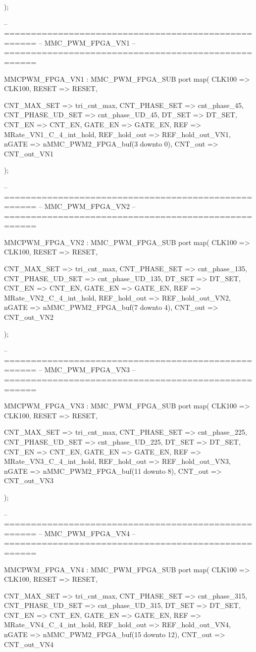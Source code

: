 \begin{mylisting}[language=VHDL,caption=ゲート信号出力モジュール,label=MMC_PWM_GEN_module_VHDL]
			);

-- ====================================================
-- MMC_PWM_FPGA_VN1
-- ====================================================

	MMCPWM_FPGA_VN1 : MMC_PWM_FPGA_SUB
		port map(
		CLK100				=> CLK100,
		RESET					=> RESET,
		
		CNT_MAX_SET			=> tri_cnt_max,
		CNT_PHASE_SET		=> cnt_phase_45,
		CNT_PHASE_UD_SET	=> cnt_phase_UD_45,
		DT_SET				=> DT_SET,
		CNT_EN				=> CNT_EN,
		GATE_EN				=> GATE_EN,
		REF					=> MRate_VN1_C_4_int_hold,
		REF_hold_out		=> REF_hold_out_VN1,
		nGATE					=> nMMC_PWM2_FPGA_buf(3 downto 0),
		CNT_out				=> CNT_out_VN1

			);
			
-- ====================================================
-- MMC_PWM_FPGA_VN2
-- ====================================================

	MMCPWM_FPGA_VN2 : MMC_PWM_FPGA_SUB
		port map(
		CLK100				=> CLK100,
		RESET					=> RESET,
		
		CNT_MAX_SET			=> tri_cnt_max,
		CNT_PHASE_SET		=> cnt_phase_135,
		CNT_PHASE_UD_SET	=> cnt_phase_UD_135,
		DT_SET				=> DT_SET,
		CNT_EN				=> CNT_EN,
		GATE_EN				=> GATE_EN,
		REF					=> MRate_VN2_C_4_int_hold,
		REF_hold_out		=> REF_hold_out_VN2,
		nGATE					=> nMMC_PWM2_FPGA_buf(7 downto 4),
		CNT_out				=> CNT_out_VN2

			);


-- ====================================================
-- MMC_PWM_FPGA_VN3
-- ====================================================

	MMCPWM_FPGA_VN3 : MMC_PWM_FPGA_SUB
		port map(
		CLK100				=> CLK100,
		RESET					=> RESET,
		
		CNT_MAX_SET			=> tri_cnt_max,
		CNT_PHASE_SET		=> cnt_phase_225,
		CNT_PHASE_UD_SET	=> cnt_phase_UD_225,
		DT_SET				=> DT_SET,
		CNT_EN				=> CNT_EN,
		GATE_EN				=> GATE_EN,
		REF					=> MRate_VN3_C_4_int_hold,
		REF_hold_out		=> REF_hold_out_VN3,
		nGATE					=> nMMC_PWM2_FPGA_buf(11 downto 8),
		CNT_out				=> CNT_out_VN3

			);

-- ====================================================
-- MMC_PWM_FPGA_VN4
-- ====================================================

	MMCPWM_FPGA_VN4 : MMC_PWM_FPGA_SUB
		port map(
		CLK100				=> CLK100,
		RESET					=> RESET,
		
		CNT_MAX_SET			=> tri_cnt_max,
		CNT_PHASE_SET		=> cnt_phase_315,
		CNT_PHASE_UD_SET	=> cnt_phase_UD_315,
		DT_SET				=> DT_SET,
		CNT_EN				=> CNT_EN,
		GATE_EN				=> GATE_EN,
		REF					=> MRate_VN4_C_4_int_hold,
		REF_hold_out		=> REF_hold_out_VN4,
		nGATE					=> nMMC_PWM2_FPGA_buf(15 downto 12),
		CNT_out				=> CNT_out_VN4


\end{mylisting}
